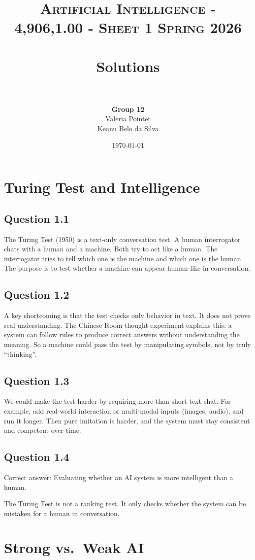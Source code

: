 \documentclass[paper=a4, fontsize=11pt]{scrartcl}
\title{
\normalfont \normalsize
\textsc{Artificial Intelligence - 4,906,1.00 - Sheet 1 Spring 2026} \\[10pt]
\horrule{0.5pt} \\[0.4cm]
\huge Solutions \\[-2pt]
\horrule{2pt} \\[0.5cm]
}
\author{
\textbf{Group 12}\\
Valeria Pointet\\
Keanu Belo da Silva
}
\date{\normalsize\today}
\begin{document}
\maketitle

\section{Turing Test and Intelligence}

\subsection*{Question 1.1}
The Turing Test (1950) is a text-only conversation test.
A human interrogator chats with a human and a machine.
Both try to act like a human.
The interrogator tries to tell which one is the machine and which one is the human.
The purpose is to test whether a machine can appear human-like in conversation.

\subsection*{Question 1.2}
A key shortcoming is that the test checks only behavior in text.
It does not prove real understanding.
The Chinese Room thought experiment explains this:
a system can follow rules to produce correct answers without understanding the meaning.
So a machine could pass the test by manipulating symbols, not by truly ``thinking''.

\subsection*{Question 1.3}
We could make the test harder by requiring more than short text chat.
For example, add real-world interaction or multi-modal inputs (images, audio), and run it longer.
Then pure imitation is harder, and the system must stay consistent and competent over time.

\subsection*{Question 1.4}
Correct answer: Evaluating whether an AI system is more intelligent than a human.

The Turing Test is not a ranking test.
It only checks whether the system can be mistaken for a human in conversation.

\section{Strong vs.\ Weak AI}
\end{document}

